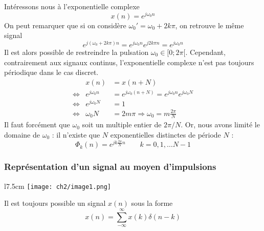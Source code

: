 	Intéressons nous à l'exponentielle complexe
	\begin{equation}
	x(n) = e^{j\omega_0n}
	\end{equation}
	On peut remarquer que si on considère $\omega_0' = \omega_0+2k\pi$, on retrouve 
	le même signal
	\begin{equation}
	e^{j(\omega_0+2k\pi)n} = e^{j\omega_0n}e^{j2k\pi n} = e^{j\omega_0n}
	\end{equation}
	Il est alors possible de restreindre la pulsation $\omega_0\in[0;2\pi[$. Cependant, 
	contrairement aux signaux continus, l'exponentielle complexe n'est pas toujours 
	périodique dans le cas discret.
	\begin{equation}
	\begin{array}{lll}
	&x(n)&=  x(n+N)\\
	\Leftrightarrow &e^{j\omega_0n} &= e^{j\omega_0(n+N)} = e^{j\omega_0n}e^{j\omega_0N}\\
	\Leftrightarrow &e^{j\omega_0N} &= 1\\
	\Leftrightarrow &\omega_0N &= 2m\pi \Longrightarrow \omega_0 = m\frac{2\pi}{N}
	\end{array}
	\end{equation}
	Il faut forcément que $\omega_0$ soit un multiple entier de $2\pi/N$. Or, nous avons 
	limité le domaine de $\omega_0$ : il n'existe que $N$ exponentielles distinctes de 
	période $N$ :
	\begin{equation}
	\Phi_k(n) = e^{jk\frac{2\pi}{N}n}\qquad k=0,1,\dots N-1
	\end{equation}
	
	

		\subsubsection{Représentation d'un signal au moyen d'impulsions}
		\begin{wrapfigure}[8]{l}{7.5cm}
		\vspace{-5mm}
		\texttt{[image: ch2/image1.png]}
		\end{wrapfigure}
		Il est toujours possible un signal $x(n)$ sous la forme
		\begin{equation}
		x(n) = \sum_{-\infty}^\infty x(k)\delta(n-k)
		\end{equation}\ \\
		\\
		
	
	
